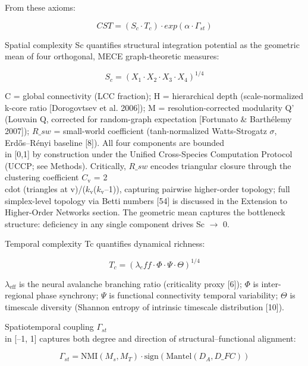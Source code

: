 \documentclass[a4paper,12pt]{article}
\begin{document}
From these axioms:


\begin{equation}
CST = (S_c \cdot T_c) \cdot exp(\alpha \cdot \Gamma_{st}) \tag{1}
\end{equation}


Spatial complexity Sc quantifies structural integration potential as the geometric mean of four orthogonal, MECE graph-theoretic measures:


\begin{equation}
S_c = (X_1 \cdot X_2 \cdot X_3 \cdot X_4)^{1/4} \tag{2}
\end{equation}


C = global connectivity (LCC fraction); H = hierarchical depth (scale-normalized k-core ratio [Dorogovtsev et al. 2006]); M = resolution-corrected modularity Q' (Louvain Q, corrected for random-graph expectation [Fortunato \& Barth\'{e}lemy 2007]); $R\_{sw}$ = small-world coefficient (tanh-normalized Watts-Strogatz $\sigma$, Erd\H{o}s--R\'{e}nyi baseline [8]). All four components are bounded  \\in  [0,1] by construction under the Unified Cross-Species Computation Protocol (UCCP; see Methods). Critically, $R\_{sw}$ encodes triangular closure through the clustering coefficient $C_{\text{v}}$ = 2 \\cdot (triangles at v)/($k_{\text{v}}$($k_{\text{v}}$--1)), capturing pairwise higher-order topology; full simplex-level topology via Betti numbers [54] is discussed in the Extension to Higher-Order Networks section. The geometric mean captures the bottleneck structure: deficiency in any single component drives Sc $\rightarrow$ 0.


Temporal complexity Tc quantifies dynamical richness:


\begin{equation}
T_c = (\lambda_eff \cdot \Phi \cdot \Psi \cdot \Theta)^{1/4} \tag{3}
\end{equation}


$\lambda_{\text{eff}}$ is the neural avalanche branching ratio (criticality proxy [6]); $\Phi$ is inter-regional phase synchrony; $\Psi$ is functional connectivity temporal variability; $\Theta$ is timescale diversity (Shannon entropy of intrinsic timescale distribution [10]).


Spatiotemporal coupling $\Gamma_{st}$  \\in  [--1, 1] captures both degree and direction of structural--functional alignment:


\begin{equation}
\Gamma_{st} = \text{NMI}(M_s, M_T) \cdot \text{sign}(\text{Mantel}(D_A, D\_{FC})) \tag{4}
\end{equation}
\end{document}
